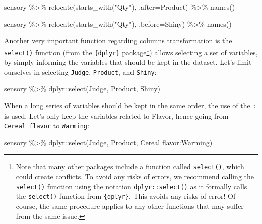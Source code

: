 \documentclass[
]{book}
\newenvironment{Shaded}{\begin{snugshade}}{\end{snugshade}}
\newcommand{\AttributeTok}[1]{\textcolor[rgb]{0.77,0.63,0.00}{#1}}
\newcommand{\FunctionTok}[1]{\textcolor[rgb]{0.00,0.00,0.00}{#1}}
\newcommand{\NormalTok}[1]{#1}
\newcommand{\SpecialCharTok}[1]{\textcolor[rgb]{0.00,0.00,0.00}{#1}}
\newcommand{\StringTok}[1]{\textcolor[rgb]{0.31,0.60,0.02}{#1}}
\begin{document}
\begin{Shaded}
\begin{Highlighting}[]
\NormalTok{sensory }\SpecialCharTok{\%\textgreater{}\%} 
  \FunctionTok{relocate}\NormalTok{(}\FunctionTok{starts\_with}\NormalTok{(}\StringTok{"Qty"}\NormalTok{), }\AttributeTok{.after=}\NormalTok{Product) }\SpecialCharTok{\%\textgreater{}\%} 
  \FunctionTok{names}\NormalTok{()}

\NormalTok{sensory }\SpecialCharTok{\%\textgreater{}\%} 
  \FunctionTok{relocate}\NormalTok{(}\FunctionTok{starts\_with}\NormalTok{(}\StringTok{"Qty"}\NormalTok{), }\AttributeTok{.before=}\NormalTok{Shiny) }\SpecialCharTok{\%\textgreater{}\%} 
  \FunctionTok{names}\NormalTok{()}
\end{Highlighting}
\end{Shaded}

Another very important function regarding columns transformation is the \texttt{select()} function (from the \texttt{\{dplyr\}} package\footnote{Note that many other packages include a function called \texttt{select()}, which could create conflicts. To avoid any risks of errors, we recommend calling the \texttt{select()} function using the notation \texttt{dplyr::select()} as it formally calls the \texttt{select()} function from \texttt{\{dplyr\}}. This avoids any risks of error! Of course, the same procedure applies to any other functions that may suffer from the same issue.}) allows selecting a set of variables, by simply informing the variables that should be kept in the dataset. Let's limit ourselves in selecting \texttt{Judge}, \texttt{Product}, and \texttt{Shiny}:

\begin{Shaded}
\begin{Highlighting}[]
\NormalTok{sensory }\SpecialCharTok{\%\textgreater{}\%} 
\NormalTok{  dplyr}\SpecialCharTok{::}\FunctionTok{select}\NormalTok{(Judge, Product, Shiny)}
\end{Highlighting}
\end{Shaded}

When a long series of variables should be kept in the same order, the use of the \texttt{:} is used.
Let's only keep the variables related to Flavor, hence going from \texttt{Cereal\ flavor} to \texttt{Warming}:

\begin{Shaded}
\begin{Highlighting}[]
\NormalTok{sensory }\SpecialCharTok{\%\textgreater{}\%} 
\NormalTok{  dplyr}\SpecialCharTok{::}\FunctionTok{select}\NormalTok{(Judge, Product, }\StringTok{\textasciigrave{}}\AttributeTok{Cereal flavor}\StringTok{\textasciigrave{}}\SpecialCharTok{:}\NormalTok{Warming)}
\end{Highlighting}
\end{Shaded}
\end{document}
